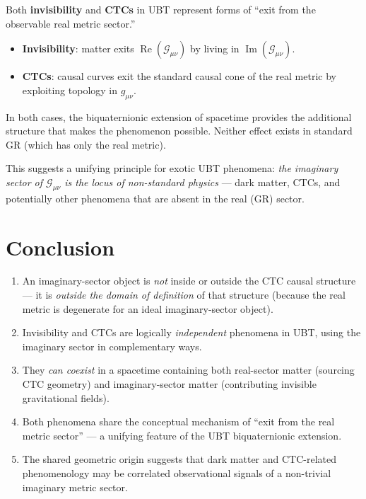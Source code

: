 \documentclass[12pt]{article}
\begin{document}
\begin{center}
\begin{tcolorbox}[colback=blue!5, title=Key Insight]
Both \textbf{invisibility} and \textbf{CTCs} in UBT represent forms of
``exit from the observable real metric sector.''
\begin{itemize}
  \item \textbf{Invisibility}: matter exits $\operatorname{Re}(\mathcal{G}_{\mu\nu})$
    by living in $\operatorname{Im}(\mathcal{G}_{\mu\nu})$.
  \item \textbf{CTCs}: causal curves exit the standard causal cone
    of the real metric by exploiting topology in $g_{\mu\nu}$.
\end{itemize}
In both cases, the biquaternionic extension of spacetime provides
the additional structure that makes the phenomenon possible.
Neither effect exists in standard GR (which has only the real metric).
\end{tcolorbox}
\end{center}

This suggests a unifying principle for exotic UBT phenomena:
\emph{the imaginary sector of $\mathcal{G}_{\mu\nu}$ is the locus of
non-standard physics} — dark matter, CTCs, and potentially other
phenomena that are absent in the real (GR) sector.

\section{Conclusion}

\begin{enumerate}
  \item An imaginary-sector object is \emph{not} inside or outside
    the CTC causal structure — it is \emph{outside the domain of
    definition} of that structure (because the real metric is
    degenerate for an ideal imaginary-sector object).
  \item Invisibility and CTCs are logically \emph{independent}
    phenomena in UBT, using the imaginary sector in complementary ways.
  \item They \emph{can coexist} in a spacetime containing both
    real-sector matter (sourcing CTC geometry) and imaginary-sector
    matter (contributing invisible gravitational fields).
  \item Both phenomena share the conceptual mechanism of ``exit from
    the real metric sector'' — a unifying feature of the UBT
    biquaternionic extension.
  \item The shared geometric origin suggests that dark matter and
    CTC-related phenomenology may be correlated observational signals
    of a non-trivial imaginary metric sector.
\end{enumerate}
\end{document}
